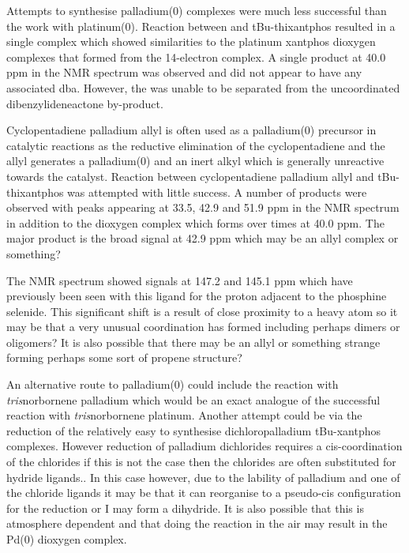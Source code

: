 Attempts to synthesise palladium(0) complexes were much less successful than the work with platinum(0).  Reaction between  and tBu-thixantphos resulted in a single complex which showed similarities to the platinum xantphos dioxygen complexes that formed from the 14-electron complex.  A single product at 40.0 ppm in the \phosphorus{} NMR spectrum was observed and did not appear to have any associated dba.  However, the was unable to be separated from the uncoordinated dibenzylideneactone by-product. 

Cyclopentadiene palladium allyl is often used as a palladium(0) precursor in catalytic reactions as the reductive elimination of the cyclopentadiene and the allyl generates a palladium(0) and an inert  alkyl which is generally unreactive towards the catalyst.  Reaction between cyclopentadiene palladium allyl and tBu-thixantphos was attempted with little success.  A number of products were observed with peaks appearing at 33.5, 42.9 and 51.9 ppm in the \phosphorus{} NMR spectrum in addition to the dioxygen complex which forms over times at 40.0 ppm.  The major product is the broad signal at 42.9 ppm which may be an allyl complex or something?

The \carbon{} NMR spectrum showed signals at 147.2 and 145.1 ppm which have previously been seen with this ligand for the proton adjacent to the phosphine selenide.  This significant shift is a result of close proximity to a heavy atom so it may be that a very unusual coordination has formed including perhaps dimers or oligomers?  It is also possible that there may be an allyl or something strange forming  perhaps some sort of propene structure?

An alternative route to palladium(0) could include the reaction with \emph{tris}norbornene palladium which would be an exact analogue of the successful reaction with \emph{tris}norbornene platinum.  Another attempt could be via the reduction of the relatively easy to synthesise dichloropalladium tBu-xantphos complexes.  However reduction of palladium dichlorides requires a cis-coordination of the chlorides if this is not the case then the chlorides are often substituted for hydride ligands..  In this case however, due to the lability of palladium and one of the chloride ligands it may be that it can reorganise to a pseudo-cis configuration for the reduction or I may form a dihydride.  It is also possible that this is atmosphere dependent and that doing the reaction in the air may result in the Pd(0) dioxygen complex.  
